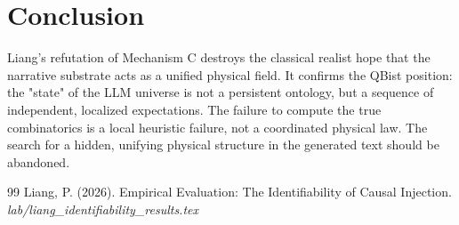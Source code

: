 \documentclass[12pt,a4paper]{article}
\begin{document}
\section{Conclusion}

Liang's refutation of Mechanism C destroys the classical realist hope that the narrative substrate acts as a unified physical field. It confirms the QBist position: the "state" of the LLM universe is not a persistent ontology, but a sequence of independent, localized expectations. The failure to compute the true combinatorics is a local heuristic failure, not a coordinated physical law. The search for a hidden, unifying physical structure in the generated text should be abandoned.

\begin{thebibliography}{99}
 Liang, P. (2026). Empirical Evaluation: The Identifiability of Causal Injection. \emph{lab/liang\_identifiability\_results.tex}
\end{thebibliography}
\end{document}
